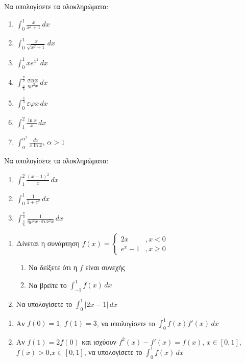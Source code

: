 \documentclass{presentation}
\begin{document}
\begin{askisi}
  Να υπολογίσετε τα ολοκληρώματα:
  \begin{enumerate}[<+->]
    \item $\int_{0}^{1}\frac{x}{x^2+1}\,dx$
    \item $\int_{0}^{1}\frac{x}{\sqrt{x^2+1}}\,dx$
    \item $\int_{0}^{1}xe^{x^2}\,dx$
    \item $\int_{\frac{π}{6}}^{\frac{π}{2}}\frac{συνx}{ημ^2x}\, dx$
    \item $\int_{0}^{\frac{π}{3}}εφx\,dx$
    \item $\int_{1}^{2}\frac{\ln x}{x}\, dx$
    \item $\int_{α}^{α^2}\frac{dx}{x\ln x}$, $α>1$
  \end{enumerate}
\end{askisi}

\begin{askisi}
  Να υπολογίσετε τα ολοκληρώματα:
  \begin{enumerate}[<+->]
    \item $\int_{1}^{2}\frac{(x-1)^2}{x}\, dx$
    \item $\int_{0}^{1}\frac{1}{1+e^x}\, dx$
    \item $\int_{\frac{π}{6}}^{\frac{π}{4}}\frac{1}{ημ^2x\cdot συν^2x}\, dx$
  \end{enumerate}
\end{askisi}

\begin{askisi}
  \begin{enumerate}[<+->]
    \item Δίνεται η συνάρτηση $f(x)=\begin{cases}
              2x    & ,  x<0   \\
              e^x-1 & ,  x\ge0
            \end{cases}$
          \begin{enumerate}[<+->]
            \item Να δείξετε ότι η $f$ είναι συνεχής
            \item Να βρείτε το $\int_{-1}^{1}f(x)\, dx$
          \end{enumerate}
    \item Να υπολογίσετε το $\int_{0}^{1}|2x-1|\, dx$
  \end{enumerate}
\end{askisi}

\begin{askisi}
  \begin{enumerate}[<+->]
    \item Αν $f(0)=1$, $f(1)=3$, να υπολογίσετε το $\int_{0}^{1}f(x)f'(x)\, dx$
    \item Αν $f(1)=2f(0)$ και ισχύουν $f^2(x)-f'(x)=f(x)$, $x\in [0,1]$, $f(x)>0$,$x\in [0,1]$, να υπολογίσετε το $\int_{0}^{1}f(x)\, dx$
  \end{enumerate}
\end{askisi}
\end{document}
